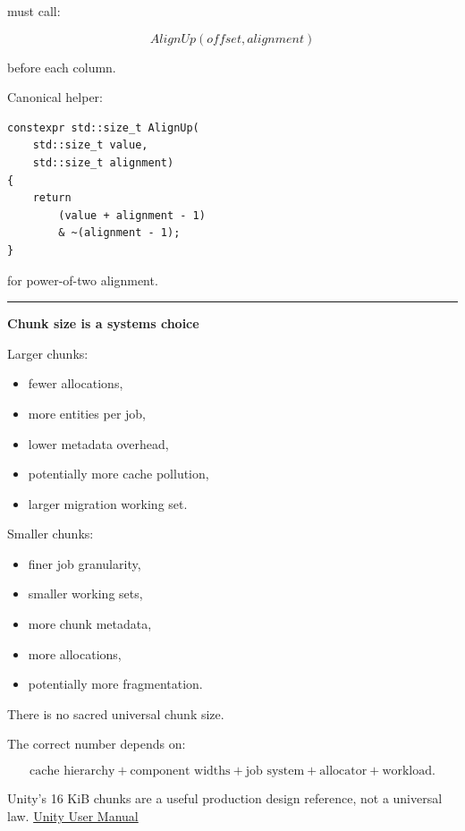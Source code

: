 must call:

\[
AlignUp(offset,alignment)
\]

before each column.

Canonical helper:

\begin{verbatim}
constexpr std::size_t AlignUp(
    std::size_t value,
    std::size_t alignment)
{
    return
        (value + alignment - 1)
        & ~(alignment - 1);
}
\end{verbatim}

for power-of-two alignment.

\begin{center}\rule{0.5\linewidth}{0.5pt}\end{center}

\textbf{Chunk size is a systems choice}

Larger chunks:

\begin{itemize}
\tightlist
\item
  fewer allocations,
\item
  more entities per job,
\item
  lower metadata overhead,
\item
  potentially more cache pollution,
\item
  larger migration working set.
\end{itemize}

Smaller chunks:

\begin{itemize}
\tightlist
\item
  finer job granularity,
\item
  smaller working sets,
\item
  more chunk metadata,
\item
  more allocations,
\item
  potentially more fragmentation.
\end{itemize}

There is no sacred universal chunk size.

The correct number depends on:

\[
\text{cache hierarchy}
+
\text{component widths}
+
\text{job system}
+
\text{allocator}
+
\text{workload}.
\]

Unity's 16 KiB chunks are a useful production design reference, not a universal law. \href{https://docs.unity.cn/Packages/com.unity.entities\%401.0/manual/concepts-archetypes.html?utm_source=chatgpt.com}{Unity User Manual}

